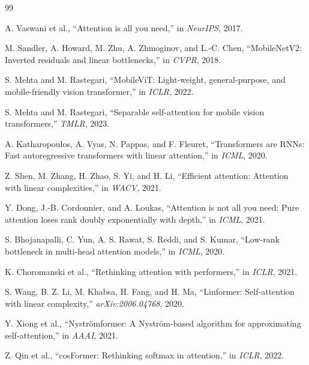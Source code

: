 \documentclass[12pt,a4paper]{article}
\begin{document}
\begin{thebibliography}{99}

A. Vaswani et al., ``Attention is all you need,'' in \textit{NeurIPS}, 2017.

M. Sandler, A. Howard, M. Zhu, A. Zhmoginov, and L.-C. Chen, ``MobileNetV2: Inverted residuals and linear bottlenecks,'' in \textit{CVPR}, 2018.

S. Mehta and M. Rastegari, ``MobileViT: Light-weight, general-purpose, and mobile-friendly vision transformer,'' in \textit{ICLR}, 2022.

S. Mehta and M. Rastegari, ``Separable self-attention for mobile vision transformers,'' \textit{TMLR}, 2023.

A. Katharopoulos, A. Vyas, N. Pappas, and F. Fleuret, ``Transformers are RNNs: Fast autoregressive transformers with linear attention,'' in \textit{ICML}, 2020.

Z. Shen, M. Zhang, H. Zhao, S. Yi, and H. Li, ``Efficient attention: Attention with linear complexities,'' in \textit{WACV}, 2021.

Y. Dong, J.-B. Cordonnier, and A. Loukas, ``Attention is not all you need: Pure attention loses rank doubly exponentially with depth,'' in \textit{ICML}, 2021.

S. Bhojanapalli, C. Yun, A. S. Rawat, S. Reddi, and S. Kumar, ``Low-rank bottleneck in multi-head attention models,'' in \textit{ICML}, 2020.

K. Choromanski et al., ``Rethinking attention with performers,'' in \textit{ICLR}, 2021.

S. Wang, B. Z. Li, M. Khabsa, H. Fang, and H. Ma, ``Linformer: Self-attention with linear complexity,'' \textit{arXiv:2006.04768}, 2020.

Y. Xiong et al., ``Nyströmformer: A Nyström-based algorithm for approximating self-attention,'' in \textit{AAAI}, 2021.

Z. Qin et al., ``cosFormer: Rethinking softmax in attention,'' in \textit{ICLR}, 2022.

\end{thebibliography}
\end{document}
